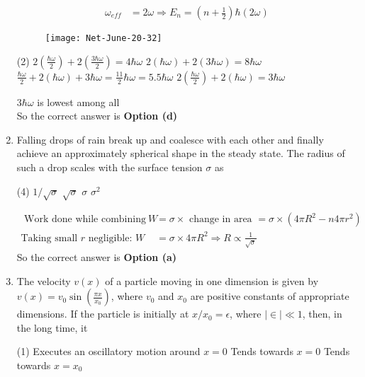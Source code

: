 \begin{enumerate}
\begin{answer}
\begin{align*}
\omega_{e f f}&=2 \omega \Rightarrow E_{n}=\left(n+\frac{1}{2}\right) \hbar(2 \omega)
	\end{align*}
	\begin{figure}[H]
		\centering
		\texttt{[image: Net-June-20-32]}
	\end{figure}
	 \begin{tasks}(2)
		\task[\text{a.}] $2\left(\frac{\hbar \omega}{2}\right)+2\left(\frac{3 \hbar \omega}{2}\right)=4 \hbar \omega$
		\task[\text{b.}]$2(\hbar \omega)+2(3 \hbar \omega)=8 \hbar \omega$
		\task[\text{c.}]$\frac{\hbar \omega}{2}+2(\hbar \omega)+3 \hbar \omega=\frac{11}{2} \hbar \omega=5.5 \hbar \omega$
		\task[\text{d.}] $2\left(\frac{\hbar \omega}{2}\right)+2(\hbar \omega)=3 \hbar \omega$
	\end{tasks}
$3 \hbar \omega$ is lowest among all\\
		So the correct answer is \textbf{Option (d)}
\end{answer}
\item  Falling drops of rain break up and coalesce with each other and finally achieve an approximately spherical shape in the steady state. The radius of such a drop scales with the surface tension $\sigma$ as
	 \begin{tasks}(4)
		\task[\textbf{a.}]$1 / \sqrt{\sigma}$
		\task[\textbf{b.}] $\sqrt{\sigma}$
		\task[\textbf{c.}]$\sigma$
		\task[\textbf{d.}] $\sigma^{2}$
	\end{tasks}
\begin{answer}
	\begin{align*}
\text{ Work done while combining }W&=\sigma \times\text{ change in area }=\sigma \times\left(4 \pi R^{2}-n 4 \pi r^{2}\right)\\
	\text{Taking small $r$ negligible: }W&=\sigma \times 4 \pi R^{2} \Rightarrow R \propto \frac{1}{\sqrt{\sigma}}
	\end{align*}
		So the correct answer is \textbf{Option (a)}
\end{answer}
\item  The velocity $v(x)$ of a particle moving in one dimension is given by $v(x)=v_{0} \sin \left(\frac{\pi x}{x_{0}}\right)$, where $v_{0}$ and $x_{0}$ are positive constants of appropriate dimensions. If the particle is initially at $x / x_{0}=\epsilon$, where $|\in| \ll 1$, then, in the long time, it
	 \begin{tasks}(1)
		\task[\textbf{a.}] Executes an oscillatory motion around $x=0$
		\task[\textbf{b.}]Tends towards $x=0$
		\task[\textbf{c.}] Tends towards $x=x_{0}$

\end{tasks}
\end{enumerate}
